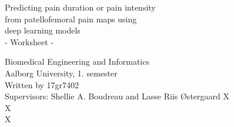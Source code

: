 \clearpage
\thispagestyle{empty}




\begin{center}
\vspace*{20\baselineskip}

{\huge Predicting pain duration or pain intensity \\ from patellofemoral pain maps using \\ deep learning models\\ \vspace{0.5cm}- Worksheet - }\\[0.2\baselineskip] %

\vspace*{12\baselineskip}


\end{center} %
Biomedical Engineering and Informatics \\
Aalborg University, 1. semester \\
Written by 17gr7402 \\
Supervisors: Shellie A. Boudreau and Lasse Riis Østergaard
{\color{white}X \\ X \\ X \\}

